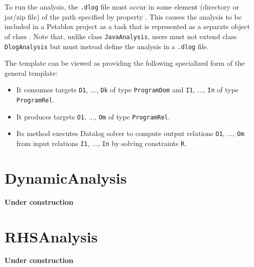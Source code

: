 To run the analysis, the {\tt .dlog} file must occur in some element (directory
or jar/zip file) of the path specified by property .
 This causes the analysis to be included in a Petablox project as a task that is
represented as a separate object of class
.
Note that, unlike class {\tt JavaAnalysis}, users must not extend class
{\tt DlogAnalysis} but must instead define the analysis in a {\tt .dlog} file.

The  template can be viewed as providing the following
specialized form of the general  template:
\begin{itemize}
\item
It consumes targets {\tt D1}, ..., {\tt Dk} of type {\tt ProgramDom} and
{\tt I1}, ..., {\tt In} of type {\tt ProgramRel}.
\item
It produces targets {\tt O1}, ..., {\tt Om} of type {\tt ProgramRel}.
\item
Its  method executes Datalog solver  to compute output
relations {\tt O1}, ..., {\tt Om} from input relations {\tt I1}, ..., {\tt In}
by solving constraints {\tt R}.
\end{itemize}

\section{DynamicAnalysis}
\label{sec:dynamic}

{\bf Under construction}

\section{RHSAnalysis}
\label{sec:rhs}

{\bf Under construction}

